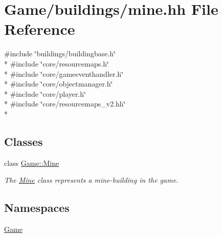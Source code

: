 \hypertarget{mine_8hh}{\section{Game/buildings/mine.hh File Reference}
\label{mine_8hh}
}
{\ttfamily \#include \char`\"{}buildings/buildingbase.\-h\char`\"{}}\\*
{\ttfamily \#include \char`\"{}core/resourcemaps.\-h\char`\"{}}\\*
{\ttfamily \#include \char`\"{}core/gameeventhandler.\-h\char`\"{}}\\*
{\ttfamily \#include \char`\"{}core/objectmanager.\-h\char`\"{}}\\*
{\ttfamily \#include \char`\"{}core/player.\-h\char`\"{}}\\*
{\ttfamily \#include \char`\"{}core/resourcemaps\-\_\-v2.\-hh\char`\"{}}\\*
\subsection*{Classes}
\begin{DoxyCompactItemize}
\item 
class \hyperlink{classGame_1_1Mine}{Game\-::\-Mine}
\begin{DoxyCompactList}\small\item\em The \hyperlink{classGame_1_1Mine}{Mine} class represents a mine-\/building in the game. \end{DoxyCompactList}\end{DoxyCompactItemize}
\subsection*{Namespaces}
\begin{DoxyCompactItemize}
\item 
\hyperlink{namespaceGame}{Game}
\end{DoxyCompactItemize}
